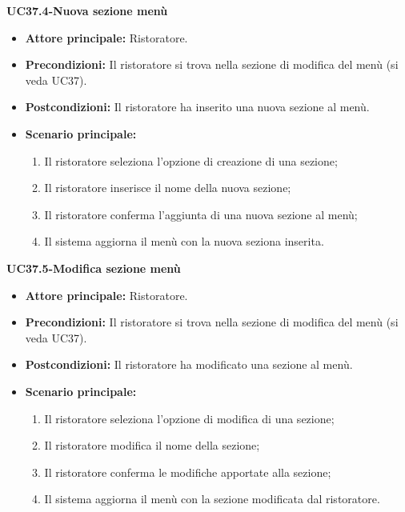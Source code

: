 \textbf{UC37.4-Nuova sezione menù}
\begin{itemize}
    \item \textbf{Attore principale:} Ristoratore.
    \item \textbf{Precondizioni:} Il ristoratore si trova nella sezione di modifica del menù (si veda UC37).
    \item \textbf{Postcondizioni:} Il ristoratore ha inserito una nuova sezione al menù.
    \item \textbf{Scenario principale:}
    \begin{enumerate}
        \item Il ristoratore seleziona l'opzione di creazione di una sezione;
        \item Il ristoratore inserisce il nome della nuova sezione;
        \item Il ristoratore conferma l'aggiunta di una nuova sezione al menù;
        \item Il sistema aggiorna il menù con la nuova seziona inserita.
    \end{enumerate}
\end{itemize}

\textbf{UC37.5-Modifica sezione menù}
\begin{itemize}
    \item \textbf{Attore principale:} Ristoratore.
    \item \textbf{Precondizioni:} Il ristoratore si trova nella sezione di modifica del menù (si veda UC37).
    \item \textbf{Postcondizioni:} Il ristoratore ha modificato una sezione al menù.
    \item \textbf{Scenario principale:}
    \begin{enumerate}
        \item Il ristoratore seleziona l'opzione di modifica di una sezione;
        \item Il ristoratore modifica il nome della sezione;
        \item Il ristoratore conferma le modifiche apportate alla sezione;
        \item Il sistema aggiorna il menù con la sezione modificata dal ristoratore.
    \end{enumerate}
\end{itemize}


